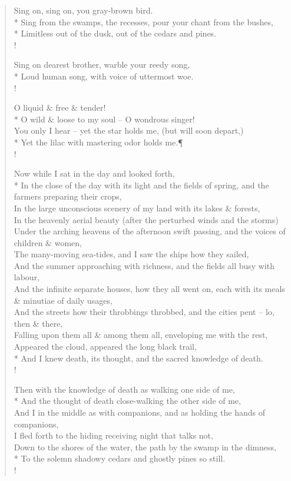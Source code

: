 \documentclass[MAIN]{subfiles}
\begin{document}
\begin{verse}
Sing on, sing on, you gray-brown bird.\\* 
Sing from the swamps, the recesses, pour your chant from the bushes,\\*
Limitless out of the dusk, out of the cedars and pines.\\!

Sing on dearest brother, warble your reedy song,\\*
Loud human song, with voice of uttermost woe.\\!

O liquid \& free \& tender!\\* 
O wild \& loose to my soul -- O wondrous singer!\\
You only I hear -- yet the star holds me, (but will soon depart,)\\*
Yet the lilac with mastering odor holds me.\P\\!

Now while I sat in the day and looked forth,\\*
In the close of the day with its light and the fields of spring, and the farmers preparing their crops,\\ 
In the large unconscious scenery of my land with its lakes \& forests,\\
In the heavenly aerial beauty (after the perturbed winds and the storms)\\
Under the arching heavens of the afternoon swift passing, and the voices of children \& women,\\
The many-moving sea-tides, and I saw the ships how they sailed,\\ 
And the summer approaching with richness, and the fields all busy with labour,\\
And the infinite separate houses, how they all went on, each with its meals \& minutiae of daily usages,\\
And the streets how their throbbings throbbed, and the cities pent -- lo, then \& there,\\
Falling upon them all \& among them all, enveloping me with the rest,\\
Appeared the cloud, appeared the long black trail,\\* 
And I knew death, its thought, and the sacred knowledge of death.\\!

Then with the knowledge of death as walking one side of me,\\*
And the thought of death close-walking the other side of me,\\
And I in the middle as with companions, and as holding the hands of companions,\\
I fled forth to the hiding receiving night that talks not,\\
Down to the shores of the water, the path by the swamp in the dimness,\\*
To the solemn shadowy cedars and ghostly pines so still.\\!


\end{verse}
\end{document}
